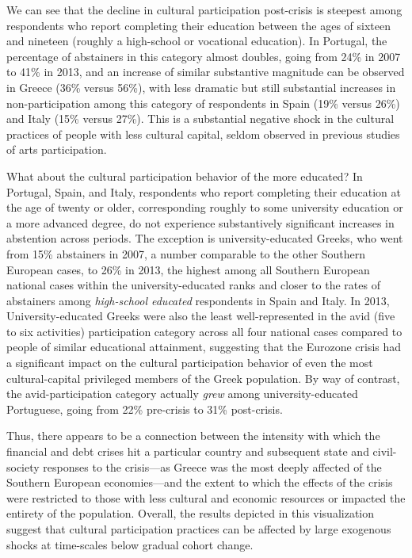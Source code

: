 \documentclass{article}
\begin{document}
We can see that the decline in cultural participation post-crisis is steepest among respondents who report completing their education between the ages of sixteen and nineteen (roughly a high-school or vocational education). In Portugal, the percentage of abstainers in this category almost doubles, going from 24\% in 2007 to 41\% in 2013, and an increase of similar substantive magnitude can be observed in Greece (36\% versus 56\%), with less dramatic but still substantial increases in non-participation among this category of respondents in Spain (19\% versus 26\%) and Italy (15\% versus 27\%). This is a substantial negative shock in the cultural practices of people with less cultural capital, seldom observed in previous studies of arts participation.

What about the cultural participation behavior of the more educated? In Portugal, Spain, and Italy, respondents who report completing their education at the age of twenty or older, corresponding roughly to some university education or a more advanced degree, do not experience substantively significant increases in abstention across periods. The exception is university-educated Greeks, who went from 15\% abstainers in 2007, a number comparable to the other Southern European cases, to 26\% in 2013, the highest among all Southern European national cases within the university-educated ranks and closer to the rates of abstainers among \textit{high-school educated} respondents in Spain and Italy. In 2013, University-educated Greeks were also the least well-represented in the avid (five to six activities) participation category across all four national cases compared to people of similar educational attainment, suggesting that the Eurozone crisis had a significant impact on the cultural participation behavior of even the most cultural-capital privileged members of the Greek population. By way of contrast, the avid-participation category actually \textit{grew} among university-educated Portuguese, going from 22\% pre-crisis to 31\% post-crisis.

Thus, there appears to be a connection between the intensity with which the financial and debt crises hit a particular country and subsequent state and civil-society responses to the crisis---as Greece was the most deeply affected of the Southern European economies---and the extent to which the effects of the crisis were restricted to those with less cultural and economic resources or impacted the entirety of the population. Overall, the results depicted in this visualization suggest that cultural participation practices can be affected by large exogenous shocks at time-scales below gradual cohort change.
\end{document}
